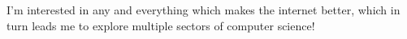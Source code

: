 \documentclass[letter,10pt]{article}
\begin{document}
I'm interested in any and everything which makes the internet better, which in turn leads me to explore multiple sectors of computer science!
\end{document}
